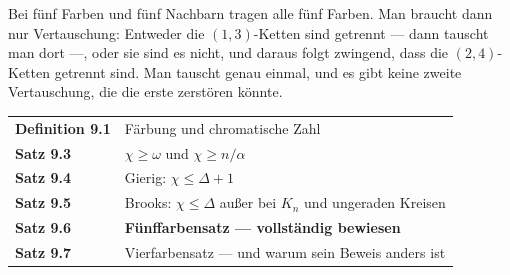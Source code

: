 \begin{aufgabe}
Bei fünf Farben und fünf Nachbarn tragen alle fünf  Farben. Man braucht dann nur  Vertauschung: Entweder die $(1,3)$-Ketten sind getrennt --- dann tauscht man dort ---, oder sie sind es nicht, und daraus folgt zwingend, dass die $(2,4)$-Ketten getrennt sind. Man tauscht genau einmal, und es gibt keine zweite Vertauschung, die die erste zerstören könnte.

\begin{center}
\begin{minipage}{0.86\textwidth}
\end{minipage}
\end{center}
\end{aufgabe}

\begin{merksatz}
\begin{center}
\renewcommand{\arraystretch}{1.5}
\begin{tabular}{@{}P{3.0cm}P{5.6cm}@{}}
\toprule
\textbf{Definition 9.1} & Färbung und chromatische Zahl\\
\textbf{Satz 9.3} & $\chi \ge \omega$ und $\chi \ge n/\alpha$\\
\textbf{Satz 9.4} & Gierig: $\chi \le \Delta+1$\\
\textbf{Satz 9.5} & Brooks: $\chi \le \Delta$ außer bei $K_n$ und ungeraden Kreisen\\
\textbf{Satz 9.6} & \textbf{Fünffarbensatz --- vollständig bewiesen}\\
\textbf{Satz 9.7} & Vierfarbensatz --- und warum sein Beweis anders ist\\
\bottomrule
\end{tabular}
\end{center}

\begin{center}
\begin{minipage}{0.88\textwidth}
\end{minipage}
\end{center}
\end{merksatz}
